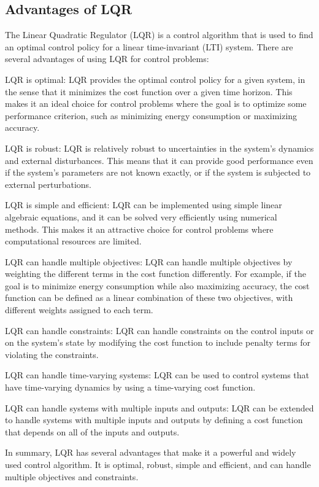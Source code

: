 \documentclass[12pt]{article}
\begin{document}
\subsection*{Advantages of LQR}
The Linear Quadratic Regulator (LQR) is a control algorithm that is used to find an optimal control policy for a linear time-invariant (LTI) system. There are several advantages of using LQR for control problems:

LQR is optimal: LQR provides the optimal control policy for a given system, in the sense that it minimizes the cost function over a given time horizon. This makes it an ideal choice for control problems where the goal is to optimize some performance criterion, such as minimizing energy consumption or maximizing accuracy.

LQR is robust: LQR is relatively robust to uncertainties in the system's dynamics and external disturbances. This means that it can provide good performance even if the system's parameters are not known exactly, or if the system is subjected to external perturbations.

LQR is simple and efficient: LQR can be implemented using simple linear algebraic equations, and it can be solved very efficiently using numerical methods. This makes it an attractive choice for control problems where computational resources are limited.

LQR can handle multiple objectives: LQR can handle multiple objectives by weighting the different terms in the cost function differently. For example, if the goal is to minimize energy consumption while also maximizing accuracy, the cost function can be defined as a linear combination of these two objectives, with different weights assigned to each term.

LQR can handle constraints: LQR can handle constraints on the control inputs or on the system's state by modifying the cost function to include penalty terms for violating the constraints.

LQR can handle time-varying systems: LQR can be used to control systems that have time-varying dynamics by using a time-varying cost function.

LQR can handle systems with multiple inputs and outputs: LQR can be extended to handle systems with multiple inputs and outputs by defining a cost function that depends on all of the inputs and outputs.

In summary, LQR has several advantages that make it a powerful and widely used control algorithm. It is optimal, robust, simple and efficient, and can handle multiple objectives and constraints.
\end{document}
